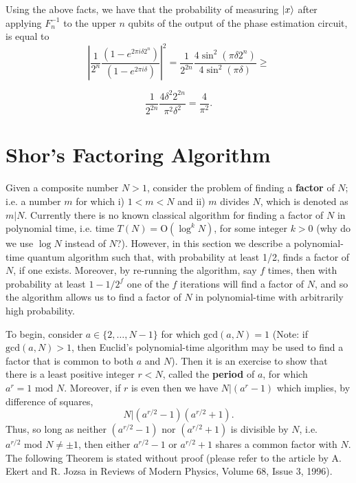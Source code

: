 \documentclass [12pt]{article}
\theoremstyle{definition}
\begin{document}
Using the above facts, we have that the probability of measuring $\ket{x}$ after applying $F_n^{-1}$ to the upper $n$ qubits of the output of the phase estimation circuit,
is equal to 
\[\left|\frac{1}{2^{n}}\frac{(1-e^{2\pi i\delta 2^n})}{(1-e^{2\pi i\delta})}\right|^2 = \frac{1}{2^{2n}}\frac{ 4\sin^2(\pi\delta 2^n)}{4\sin^2(\pi \delta)}\geq \]

\[\frac{1}{2^{2n}}\frac{4\delta^2 2^{2n}}{\pi^2 \delta^2} = \frac{4}{\pi^2}.\]















\newpage
\section*{Shor's Factoring Algorithm}

Given a composite number $N > 1$, consider the problem of finding a \textbf{factor} of $N$; i.e. a number $m$ for which i) $1 < m < N$ and ii) $m$ divides $N$, which is denoted
as $m | N$.
Currently there is no known classical algorithm for finding a factor of $N$ in polynomial time, i.e. time $T(N) = \mbox{O}(\log^k N)$, for some integer $k > 0$ (why do we use
$\log N$ instead of $N$?).
However, in this section we describe a polynomial-time quantum algorithm such that, with probability at least 1/2,  finds a factor of $N$, if one exists. Moreover, by re-running the algorithm,
say $f$ times, then with probability at least $1-1/2^f$ one of the $f$ iterations will find a factor of $N$, and so the algorithm allows us to find a factor of $N$ in polynomial-time
with arbitrarily high probability.

To begin, consider $a\in \{2,\ldots,N-1\}$ for which $\mbox{gcd}(a,N)=1$ (Note:  if $\mbox{gcd}(a,N) > 1$, then Euclid's polynomial-time algorithm may be used to find a factor
that is common to both  $a$ and $N$). Then it is an exercise to show that there is a least positive integer $r < N$, called the \textbf{period} of $a$,
 for which $a^r = 1 \mbox{ mod } N$. 
Moreover, if $r$ is even then we have $N|(a^r-1)$ which implies, by difference of squares,
\[N| (a^{r/2}-1)(a^{r/2}+1).\]
Thus, so long as neither $(a^{r/2}-1)$ nor $(a^{r/2}+1)$ is divisible by $N$, i.e. $a^{r/2} \mbox{ mod } N\not=\pm 1$, then either $a^{r/2}-1$ or $a^{r/2}+1$ shares a common factor with
$N$. The following Theorem is stated without proof (please refer to the article by A. Ekert and R. Jozsa in Reviews of Modern Physics, Volume 68, Issue 3, 1996).
\end{document}
